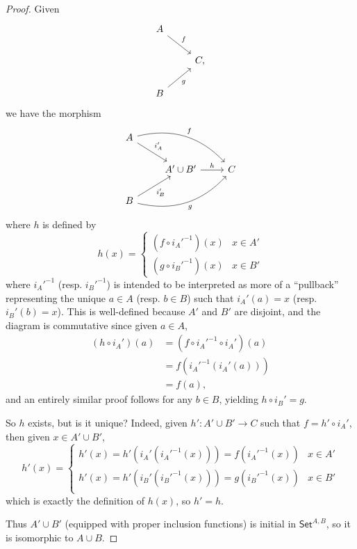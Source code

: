 \documentclass{article}
\theoremstyle{definition}
\begin{document}
\begin{proof}
	Given \begin{equation*}
		\begin{tikzcd}
			A \arrow[dr, "f"] \\
			& C, \\
			B \arrow[ur, "g"']
		\end{tikzcd}
	\end{equation*}
	we have the morphism \begin{equation*}
		\begin{tikzcd}
			A \arrow[dr, "i_A'"] \arrow[drr, bend left, "f"] \\
			& A' \cup B' \arrow[r, "h"] & C \\
			B \arrow[ur, "i_B'"'] \arrow[urr, bend right, "g"']
		\end{tikzcd}
	\end{equation*}
	where $h$ is defined by \begin{equation*}
		h(x) = \begin{cases}
			(f \circ i_A'^{-1})(x) & x \in A' \\
			(g \circ i_B'^{-1})(x) & x \in B'
		\end{cases}
	\end{equation*}
	where $i_A'^{-1}$ (resp. $i_B'^{-1}$) is intended to be interpreted as more of a ``pullback'' representing the unique $a \in A$ (resp. $b \in B$) such that $i_A'(a) = x$ (resp. $i_B'(b) = x$).
	This is well-defined because $A'$ and $B'$ are disjoint, and the diagram is commutative since given $a \in A$, \begin{align*}
		(h \circ i_A')(a) & = (f \circ i_A'^{-1} \circ i_A')(a) \\
		                  & = f (i_A'^{-1} (i_A'(a)))           \\
		                  & = f (a),
	\end{align*}
	and an entirely similar proof follows for any $b \in B$, yielding $h \circ i_B' = g$.

	So $h$ exists, but is it unique?
	Indeed, given $h' : A' \cup B' \to C$ such that $f = h' \circ i_A'$, then given $x \in A' \cup B'$, \begin{equation*}
		h'(x) = \begin{cases}
			h'(x) = h'(i_A'(i_A'^{-1}(x))) = f(i_A'^{-1}(x)) & x \in A' \\
			h'(x) = h'(i_B'(i_B'^{-1}(x))) = g(i_B'^{-1}(x)) & x \in B' \\
		\end{cases}
	\end{equation*}
	which is exactly the definition of $h(x)$, so $h' = h$.

	Thus $A' \cup B'$ (equipped with proper inclusion functions) is initial in $\mathsf{Set}^{A,B}$, so it is isomorphic to $A \cup B$.
\end{proof}
\end{document}
